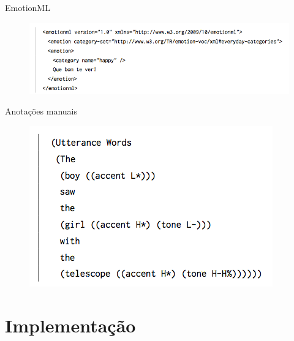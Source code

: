 \documentclass{beamer}
\begin{document}
\begin{frame}{EmotionML}
    \begin{figure}
      \includegraphics[scale=0.40]{emotionml.png}
    \end{figure}
\end{frame}

\begin{frame}{Anotações manuais}
    \begin{figure}
      \includegraphics[scale=0.60]{manual.png}
    \end{figure}
\end{frame}

\section{Implementação}
\end{document}
